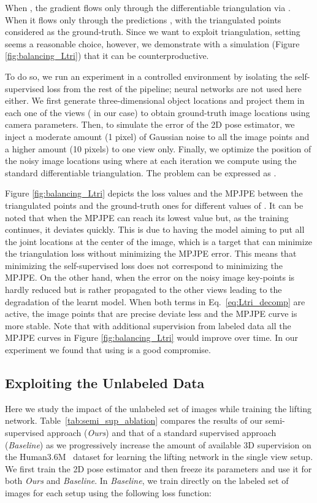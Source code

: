 \documentclass[runningheads]{llncs}
\begin{document}
When , the gradient flows only through the differentiable triangulation via . When  it flows only through the predictions , with the triangulated points considered as the ground-truth.
Since we want to exploit triangulation, setting  seems a reasonable choice, however, we demonstrate with a simulation (Figure \ref{fig:balancing_Ltri}) that it can be counterproductive.

To do so, we run an experiment in a controlled environment by isolating the self-supervised loss  from the rest of the pipeline; neural networks are not used here either. We first generate  three-dimensional object locations and project them in each one of the views ( in our case) to obtain ground-truth image locations  using camera parameters. Then, to simulate the error of the 2D pose estimator, we inject a moderate amount (1 pixel) of Gaussian noise to all the image points and a higher amount (10 pixels) to one view only. Finally, we optimize the position of the noisy image locations  using  where at each iteration we compute  using the standard differentiable triangulation. The problem can be expressed as  .

Figure \ref{fig:balancing_Ltri} depicts the loss values and the MPJPE between the triangulated points and the ground-truth ones for different values of . It can be noted that when  the MPJPE can reach its lowest value but, as the training continues, it deviates quickly. This is due to having the model aiming to put all the joint locations at the center of the image, which is a target that can minimize the triangulation loss without minimizing the MPJPE error. This means that minimizing the self-supervised loss does not correspond to minimizing the MPJPE. On the other hand, when  the error on the noisy image key-points is hardly reduced but is rather propagated to the other views leading to the degradation of the learnt model. When both terms in Eq.~\ref{eq:Ltri_decomp} are active, the image points that are precise deviate less and the MPJPE curve is more stable. Note that with additional supervision from labeled data all the MPJPE curves in Figure \ref{fig:balancing_Ltri} would improve over time. In our experiment we found that using  is a good compromise. 

\subsection*{Exploiting the Unlabeled Data}
Here we study the impact of the unlabeled set of images while training the lifting network. Table~\ref{tab:semi_sup_ablation} compares the results of our semi-supervised approach ({\it Ours}) and that of a standard supervised approach ({\it Baseline}) as we progressively increase the amount of available 3D supervision on the Human3.6M~\cite{Ionescu14a} dataset for learning the lifting network  in the single view setup. We first train the 2D pose estimator  and then freeze its parameters and use it for both {\it Ours} and {\it Baseline}. In {\it Baseline}, we train  directly on the labeled set of images  for each setup using the following loss function:
\end{document}
